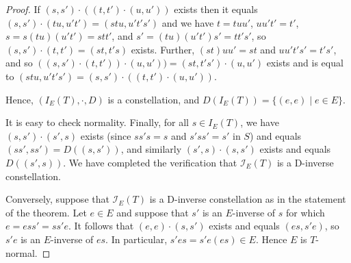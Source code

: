 \documentclass[10pt,a4paper]{amsart}
\begin{document}
\begin{proof}
If $(s,s')\cdot((t,t')\cdot (u,u'))$ exists then it equals $(s,s')\cdot(tu,u't')=(stu,u't's')$ and we have $t=tuu'$, $uu't'=t'$, $s=s(tu)(u't')=stt'$, and $s'=(tu)(u't')s'=tt's'$, so $(s,s')\cdot (t,t')=(st,t's)$ exists. Further,  $(st)uu'=st$ and $uu't's'=t's'$, and so $((s,s')\cdot(t,t'))\cdot (u,u'))=(st,t's')\cdot (u,u')$ exists and is equal to $(stu,u't's')=(s,s')\cdot((t,t')\cdot (u,u'))$.

Hence, $(I_E(T),\cdot,D)$ is a constellation, and $D(I_E(T))=\{(e,e)\mid e\in E\}$.

 It is easy to check normality. Finally, for all $s\in I_E(T)$, we have $(s,s')\cdot (s',s)$ exists (since $ss's=s$ and $s'ss'=s'$ in $S$) and equals $(ss',ss')=D((s,s'))$, and similarly $(s',s)\cdot (s,s')$ exists and equals $D((s',s))$.  We have completed the verification that $\mathcal{I}_E(T)$ is a D-inverse constellation.

Conversely, suppose that $\mathcal{I}_E(T)$ is a D-inverse constellation as in the statement of the theorem. Let $e\in E$ and suppose that $s'$ is an $E$-inverse of $s$ for which $e=ess'=ss'e$.  It follows that $(e,e)\cdot (s,s')$ exists and equals $(es,s'e)$, so $s'e$ is an $E$-inverse of $es$.  In particular, $s'es=s'e(es)\in E$.  Hence $E$ is $T$-normal.  
\end{proof}
\end{document}
